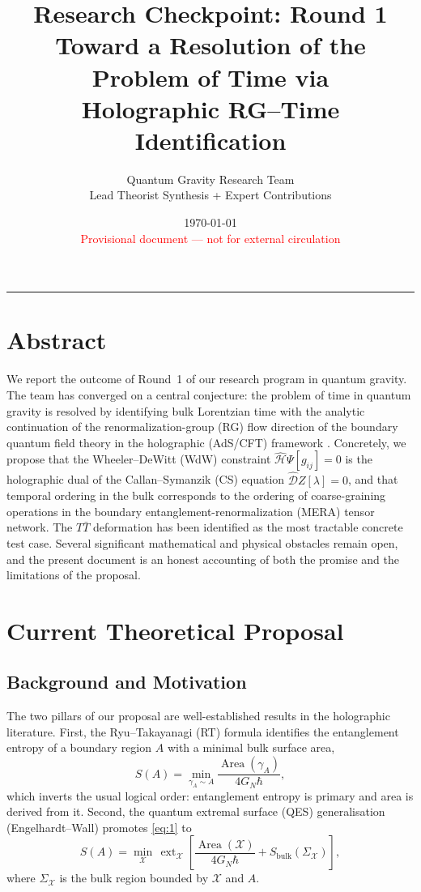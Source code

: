\documentclass[11pt,a4paper]{article}
\title{\textbf{Research Checkpoint: Round 1}\\[0.5em]
\large Toward a Resolution of the Problem of Time via\\
Holographic RG--Time Identification}
\author{Quantum Gravity Research Team\\[0.3em]
\small Lead Theorist Synthesis + Expert Contributions}
\date{\today\\[0.3em]
\small\textcolor{red}{Provisional document --- not for external circulation}}
\begin{document}
\maketitle
\tableofcontents
\bigskip
\hrule
\bigskip

\section{Abstract}

We report the outcome of Round~1 of our research program in quantum gravity.
The team has converged on a central conjecture: the problem of time in quantum
gravity is resolved by identifying bulk Lorentzian time with the analytic
continuation of the renormalization-group (RG) flow direction of the boundary
quantum field theory in the holographic (AdS/CFT) framework
\cite{maldacena1997,witten1998}.
Concretely, we propose that the Wheeler--DeWitt (WdW) constraint
$\hat{\mathcal{H}}\Psi[g_{ij}]=0$ is the holographic dual of the
Callan--Symanzik (CS) equation $\hat{\mathcal{D}}Z[\lambda]=0$, and that
temporal ordering in the bulk corresponds to the ordering of coarse-graining
operations in the boundary entanglement-renormalization (MERA) tensor network.
The $T\bar{T}$ deformation has been identified as the most tractable concrete
test case.
Several significant mathematical and physical obstacles remain open, and the
present document is an honest accounting of both the promise and the
limitations of the proposal.

\section{Current Theoretical Proposal}

\subsection{Background and Motivation}

The two pillars of our proposal are well-established results in the
holographic literature.
First, the Ryu--Takayanagi (RT) formula \cite{witten1998,maldacena1997}
identifies the entanglement entropy of a boundary region $A$ with a minimal
bulk surface area,
\begin{equation}\label{eq:1}
  S(A) = \min_{\gamma_A \sim A}
    \frac{\operatorname{Area}(\gamma_A)}{4G_N\hbar},
\end{equation}
which inverts the usual logical order: entanglement entropy is primary and
area is derived from it.
Second, the quantum extremal surface (QES) generalisation
(Engelhardt--Wall) promotes \eqref{eq:1} to
\begin{equation}\label{eq:2}
  S(A) = \min_{\mathcal{X}}\,\operatorname{ext}_{\mathcal{X}}
    \left[
      \frac{\operatorname{Area}(\mathcal{X})}{4G_N\hbar}
      + S_{\text{bulk}}(\Sigma_{\mathcal{X}})
    \right],
\end{equation}
where $\Sigma_{\mathcal{X}}$ is the bulk region bounded by $\mathcal{X}$
and $A$.
\end{document}

